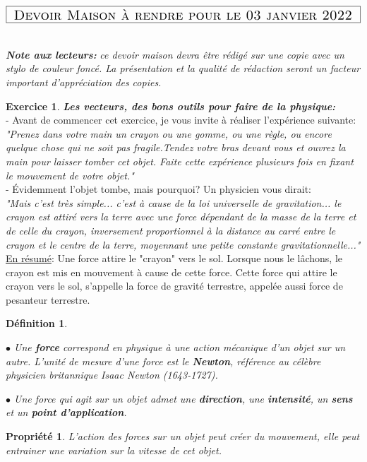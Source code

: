 \documentclass[a4paper,10.9pt]{article}
\newtheorem{defi}{Définition}
\newtheorem{prop}{Propriété}
\theoremstyle{definition}
\newtheorem{exo}{Exercice}
\begin{document}
	
\chead{}\renewcommand{\headrulewidth}{0.4pt}\renewcommand{\footrulewidth}{0.4pt}

\hfill\\[-0.7cm]
$$	\fbox{\text{\Large{ \sc Devoir Maison à rendre pour le 03 janvier  2022 }}}$$



\quad \\\textbf{\textit{Note aux lecteurs:}} \textit{ce devoir maison devra être rédigé sur une copie avec un stylo de couleur foncé. La présentation et la qualité de rédaction seront un facteur important d'appréciation des copies.}

\begin{exo}\textit{\textbf{Les vecteurs, des bons outils pour faire de la physique:}}\\[0.5mm]

\noindent - Avant de commencer cet exercice, je vous invite à réaliser l'expérience suivante:\\

\noindent \textit{"Prenez dans votre main un crayon ou une gomme, ou une règle, ou encore quelque chose qui ne soit pas fragile.Tendez votre bras devant vous et ouvrez la main pour laisser tomber cet objet. Faite cette expérience plusieurs fois en fixant le mouvement de votre objet."}\\[0.5mm]

\noindent - Évidemment l'objet tombe, mais pourquoi? Un physicien vous dirait:\\[2mm]
\noindent \textit{"Mais c'est très simple... c'est à cause de la loi universelle de gravitation... le crayon est attiré vers la terre avec une force dépendant de la masse de la terre et de celle du crayon, inversement proportionnel à la distance au carré entre le crayon et le centre de la terre, moyennant une petite constante gravitationnelle..."}\\[2mm]
\noindent\underline{En résumé}: Une force attire le "crayon" vers le sol. Lorsque nous le lâchons, le crayon est mis en mouvement à cause de cette force. Cette force qui attire le crayon vers le sol, s'appelle la force de gravité terrestre, appelée aussi force de pesanteur terrestre.

\begin{defi}\quad\\
	\par $\bullet$ \quad Une \textbf{ force} correspond en physique à une action mécanique d'un objet sur un autre. L'unité de mesure d'une force est le \textbf{Newton}, référence au célèbre physicien britannique Isaac Newton (1643-1727).\\
	\par $\bullet$ \quad Une force qui agit sur un objet admet une \textbf{direction}, une \textbf{intensité}, un \textbf{sens} et un \textbf{point d'application}.   
\end{defi}  
\begin{prop}
	L'action des forces sur un objet peut créer du mouvement, elle peut entrainer une variation sur la vitesse de cet objet.
\end{prop}

\end{exo}
\end{document}
